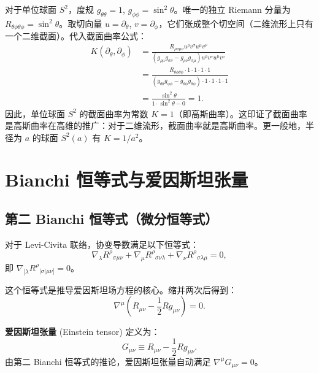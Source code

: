 \begin{example}[$S^2$ 上的截面曲率计算]
对于单位球面 $S^2$，度规 $g_{\theta\theta}=1$, $g_{\phi\phi}=\sin^2\theta$。唯一的独立 Riemann 分量为 $R_{\theta\phi\theta\phi} = \sin^2\theta$。取切向量 $u = \partial_\theta$, $v = \partial_\phi$，它们张成整个切空间（二维流形上只有一个二维截面）。代入截面曲率公式：
\begin{align}
    K(\partial_\theta, \partial_\phi)
    &= \frac{R_{\rho\sigma\mu\nu} u^\rho v^\sigma u^\mu v^\nu}
            {(g_{\rho\mu}g_{\sigma\nu} - g_{\rho\nu}g_{\sigma\mu}) u^\rho v^\sigma u^\mu v^\nu} \nonumber\\
    &= \frac{R_{\theta\phi\theta\phi} \cdot 1 \cdot 1 \cdot 1 \cdot 1}
            {(g_{\theta\theta}g_{\phi\phi} - g_{\theta\phi}g_{\theta\phi}) \cdot 1 \cdot 1 \cdot 1 \cdot 1} \nonumber\\
    &= \frac{\sin^2\theta}{1 \cdot \sin^2\theta - 0} = 1.
\end{align}
因此，单位球面 $S^2$ 的截面曲率为常数 $K=1$（即高斯曲率）。这印证了截面曲率是高斯曲率在高维的推广：对于二维流形，截面曲率就是高斯曲率。更一般地，半径为 $a$ 的球面 $S^2(a)$ 有 $K = 1/a^2$。
\end{example}

\section{Bianchi 恒等式与爱因斯坦张量}

\subsection{第二 Bianchi 恒等式（微分恒等式）}

\begin{theorem}
对于 Levi-Civita 联络，协变导数满足以下恒等式：
\begin{equation}
    \boxed{\nabla_\lambda R^\rho{}_{\sigma\mu\nu} + \nabla_\mu R^\rho{}_{\sigma\nu\lambda} + \nabla_\nu R^\rho{}_{\sigma\lambda\mu} = 0},
\end{equation}
即 $\nabla_{[\lambda} R^\rho{}_{|\sigma|\mu\nu]} = 0$。
\end{theorem}

这个恒等式是推导爱因斯坦场方程的核心。缩并两次后得到：
\begin{equation}
    \nabla^\mu \left( R_{\mu\nu} - \frac{1}{2} R g_{\mu\nu} \right) = 0.
\end{equation}

\begin{definition}[爱因斯坦张量]
\textbf{爱因斯坦张量} (Einstein tensor) 定义为：
\begin{equation}
    G_{\mu\nu} \equiv R_{\mu\nu} - \frac{1}{2} R g_{\mu\nu}.
\end{equation}
由第二 Bianchi 恒等式的推论，爱因斯坦张量自动满足 $\nabla^\mu G_{\mu\nu} = 0$。
\end{definition}

